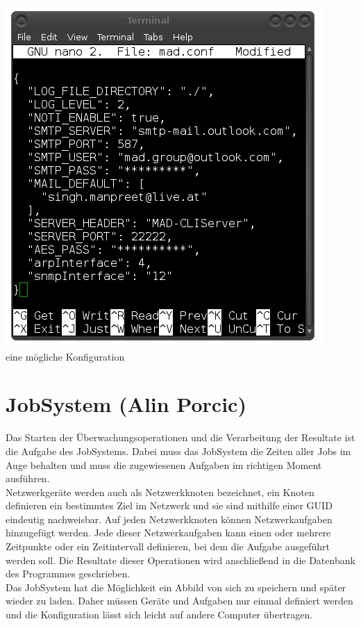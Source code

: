 \documentclass[12pt,a4paper]{report}
\begin{document}
\begin{onehalfspace}
\begin{center}
\includegraphics[scale=0.6]{img/madconf.png}\\
eine mögliche Konfiguration
\end{center}

\chapter{JobSystem (Alin Porcic)}

Das Starten der Überwachungsoperationen und die Verarbeitung der Resultate ist die Aufgabe des JobSystems. Dabei muss das JobSystem die Zeiten aller Jobs im Auge behalten und muss die zugewiesenen Aufgaben im richtigen Moment ausführen.\\
Netzwerkgeräte werden auch als Netzwerkknoten bezeichnet, ein Knoten definieren ein bestimmtes Ziel im Netzwerk und sie sind mithilfe einer GUID eindeutig nachweisbar. Auf jeden Netzwerkknoten können Netzwerkaufgaben hinzugefügt werden. Jede dieser Netzwerkaufgaben kann einen oder mehrere Zeitpunkte oder ein Zeitintervall definieren, bei dem die Aufgabe ausgeführt werden soll. Die Resultate dieser Operationen wird anschließend in die Datenbank des Programmes geschrieben.\\
Das JobSystem hat die Möglichkeit ein Abbild von sich zu speichern und später wieder zu laden. Daher müssen Geräte und Aufgaben nur einmal definiert werden und die Konfiguration lässt sich leicht auf andere Computer übertragen.


\end{onehalfspace}
\end{document}
